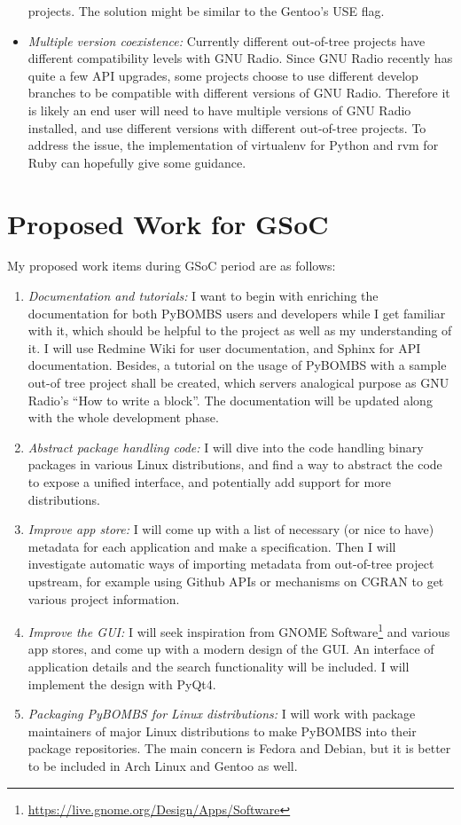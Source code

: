 \documentclass[a4paper]{article}
\begin{document}
\begin{itemize}
    projects. The solution might be similar to the Gentoo's USE flag.
  \item \emph{Multiple version coexistence:} Currently different
    out-of-tree projects have different compatibility levels with GNU
    Radio. Since GNU Radio recently has quite a few API upgrades,
    some projects choose to use different develop branches to be
    compatible with different versions of GNU Radio. Therefore it is
    likely an end user will need to have multiple versions of GNU Radio
    installed, and use different versions with different out-of-tree
    projects. To address the issue, the implementation of
    virtualenv for Python and rvm for Ruby can hopefully give some guidance.
\end{itemize}

\section{Proposed Work for GSoC}

My proposed work items during GSoC period are as follows:

\begin{enumerate}
  \item \emph{Documentation and tutorials:} I want to begin with
    enriching the documentation for both PyBOMBS users and developers
    while I get familiar with it, which should be helpful to the
    project as well as my understanding of it. I will use Redmine Wiki
    for user documentation, and Sphinx for API documentation.
    Besides, a tutorial on the usage of PyBOMBS with a sample out-of\-
    tree project shall be created, which servers analogical purpose as
    GNU Radio's ``How to write a block''. The documentation will be
    updated along with the whole development phase.
  \item \emph{Abstract package handling code:} I will dive into the
    code handling binary packages in various Linux distributions, and
    find a way to abstract the code to expose a unified interface, and
    potentially add support for more distributions.
  \item \emph{Improve app store:} I will come up with a list of
    necessary (or nice to have) metadata for each application and make a
    specification. Then I will investigate automatic ways of importing
    metadata from out-of-tree project upstream, for example using Github
    APIs or mechanisms on CGRAN to get various project information.
  \item \emph{Improve the GUI:} I will seek inspiration from GNOME
    Software\footnote{\url{https://live.gnome.org/Design/Apps/Software}}
    and various app stores, and come up with a modern design
    of the GUI. An interface of application details and the search
    functionality will be included. I will implement the design with
    PyQt4.
  \item \emph{Packaging PyBOMBS for Linux distributions:} I will
    work with package maintainers of major Linux distributions to make
    PyBOMBS into their package repositories. The main concern is Fedora
    and Debian, but it is better to be included in Arch Linux and Gentoo
    as well.
\end{enumerate}
\end{document}
